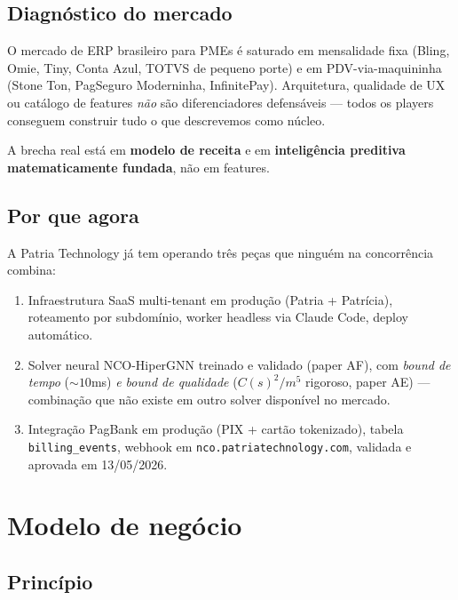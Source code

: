 \documentclass[11pt,a4paper]{article}
\begin{document}
\subsection{Diagnóstico do mercado}

O mercado de ERP brasileiro para PMEs é saturado em mensalidade fixa (Bling,
Omie, Tiny, Conta Azul, TOTVS de pequeno porte) e em PDV-via-maquininha
(Stone Ton, PagSeguro Moderninha, InfinitePay). Arquitetura, qualidade de UX
ou catálogo de features \emph{não} são diferenciadores defensáveis --- todos os
players conseguem construir tudo o que descrevemos como núcleo.

A brecha real está em \textbf{modelo de receita} e em \textbf{inteligência
preditiva matematicamente fundada}, não em features.

\subsection{Por que agora}

A Patria Technology já tem operando três peças que ninguém na concorrência
combina:

\begin{enumerate}[leftmargin=2em]
  \item Infraestrutura SaaS multi-tenant em produção (Patria + Patrícia),
        roteamento por subdomínio, worker headless via Claude Code,
        deploy automático.
  \item Solver neural NCO-HiperGNN treinado e validado (paper AF), com
        \emph{bound de tempo} ($\sim 10$ms) \emph{e bound de qualidade}
        ($C(s)^2/m^5$ rigoroso, paper AE) --- combinação que não existe
        em outro solver disponível no mercado.
  \item Integração PagBank em produção (PIX + cartão tokenizado), tabela
        \texttt{billing\_events}, webhook em
        \texttt{nco.patriatechnology.com}, validada e aprovada em 13/05/2026.
\end{enumerate}

\section{Modelo de negócio}

\subsection{Princípio}
\end{document}
